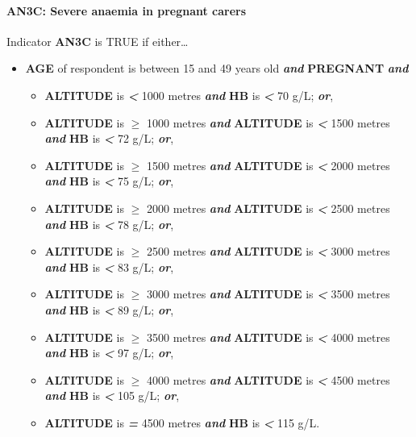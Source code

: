 \documentclass[12pt,a4paper]{article}
\let\oldparagraph\paragraph
\renewcommand{\paragraph}[1]{\oldparagraph{#1}\mbox{}}
\begin{document}
\newpage

\hypertarget{an3c-severe-anaemia-in-pregnant-carers}{%
\paragraph{AN3C: Severe anaemia in pregnant carers}\label{an3c-severe-anaemia-in-pregnant-carers}}

Indicator \textbf{AN3C} is TRUE if either\ldots{}

\begin{itemize}
\item
  \textbf{AGE} of respondent is between 15 and 49 years old \textbf{\emph{and}} \textbf{PREGNANT} \textbf{\emph{and}}

  \begin{itemize}
  \item
    \textbf{ALTITUDE} is \textbf{\emph{\textless{}}} 1000 metres \textbf{\emph{and}} \textbf{HB} is \textbf{\emph{\textless{}}} 70 g/L; \textbf{\emph{or}},
  \item
    \textbf{ALTITUDE} is \textbf{\emph{\(\geq\)}} 1000 metres \textbf{\emph{and}} \textbf{ALTITUDE} is \textbf{\emph{\textless{}}} 1500 metres \textbf{\emph{and}} \textbf{HB} is \textbf{\emph{\textless{}}} 72 g/L; \textbf{\emph{or}},
  \item
    \textbf{ALTITUDE} is \textbf{\emph{\(\geq\)}} 1500 metres \textbf{\emph{and}} \textbf{ALTITUDE} is \textbf{\emph{\textless{}}} 2000 metres \textbf{\emph{and}} \textbf{HB} is \textbf{\emph{\textless{}}} 75 g/L; \textbf{\emph{or}},
  \item
    \textbf{ALTITUDE} is \textbf{\emph{\(\geq\)}} 2000 metres \textbf{\emph{and}} \textbf{ALTITUDE} is \textbf{\emph{\textless{}}} 2500 metres \textbf{\emph{and}} \textbf{HB} is \textbf{\emph{\textless{}}} 78 g/L; \textbf{\emph{or}},
  \item
    \textbf{ALTITUDE} is \textbf{\emph{\(\geq\)}} 2500 metres \textbf{\emph{and}} \textbf{ALTITUDE} is \textbf{\emph{\textless{}}} 3000 metres \textbf{\emph{and}} \textbf{HB} is \textbf{\emph{\textless{}}} 83 g/L; \textbf{\emph{or}},
  \item
    \textbf{ALTITUDE} is \textbf{\emph{\(\geq\)}} 3000 metres \textbf{\emph{and}} \textbf{ALTITUDE} is \textbf{\emph{\textless{}}} 3500 metres \textbf{\emph{and}} \textbf{HB} is \textbf{\emph{\textless{}}} 89 g/L; \textbf{\emph{or}},
  \item
    \textbf{ALTITUDE} is \textbf{\emph{\(\geq\)}} 3500 metres \textbf{\emph{and}} \textbf{ALTITUDE} is \textbf{\emph{\textless{}}} 4000 metres \textbf{\emph{and}} \textbf{HB} is \textbf{\emph{\textless{}}} 97 g/L; \textbf{\emph{or}},
  \item
    \textbf{ALTITUDE} is \textbf{\emph{\(\geq\)}} 4000 metres \textbf{\emph{and}} \textbf{ALTITUDE} is \textbf{\emph{\textless{}}} 4500 metres \textbf{\emph{and}} \textbf{HB} is \textbf{\emph{\textless{}}} 105 g/L; \textbf{\emph{or}},
  \item
    \textbf{ALTITUDE} is \textbf{\emph{=}} 4500 metres \textbf{\emph{and}} \textbf{HB} is \textbf{\emph{\textless{}}} 115 g/L.
  \end{itemize}
\end{itemize}
\end{document}
